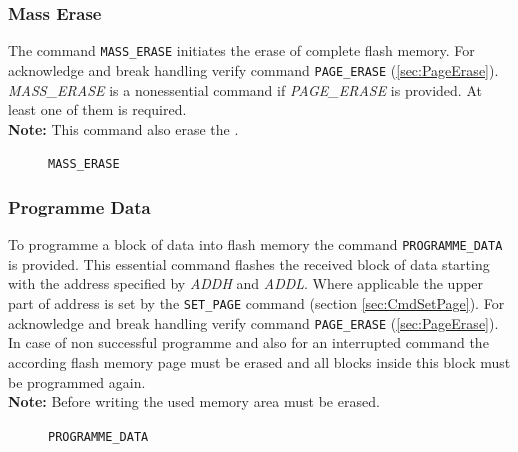 \subsubsection{Mass Erase}
\label{sec:MassErase}
The command \texttt{MASS_ERASE} initiates the erase of complete flash memory. For acknowledge and break handling verify command \texttt{PAGE_ERASE} (\ref{sec:PageErase}).\\
\emph{MASS_ERASE} is a nonessential command if \emph{PAGE_ERASE} is provided. At least one of them is required.\\
\textbf{Note:} This command also erase the \bro{}.\\ 
\begin{figure}[h]
\begin{center}
\caption{\texttt{MASS_ERASE}}
\label{fig:CmdMassErase}
\end{center}
\end{figure}

\subsubsection{Programme Data}
\label{sec:ProgrammeData}
To programme a block of data into flash memory the command \texttt{PROGRAMME_DATA} is provided. This essential command flashes the received block of data starting with the address specified by \emph{ADDH} and \emph{ADDL}. Where applicable the upper part of address is set by the \texttt{SET_PAGE} command (section \ref{sec:CmdSetPage}). 
For acknowledge and break handling verify command \texttt{PAGE_ERASE} (\ref{sec:PageErase}). In case of non successful programme and also for an interrupted command the according flash memory page must be erased and all blocks inside this block must be programmed again.\\
\textbf{Note:} Before writing the used memory area must be erased.

\begin{figure}[h]
\begin{center}
\caption{\texttt{PROGRAMME_DATA}}
\label{fig:CmdProgrammeData}
\end{center}
\end{figure}

